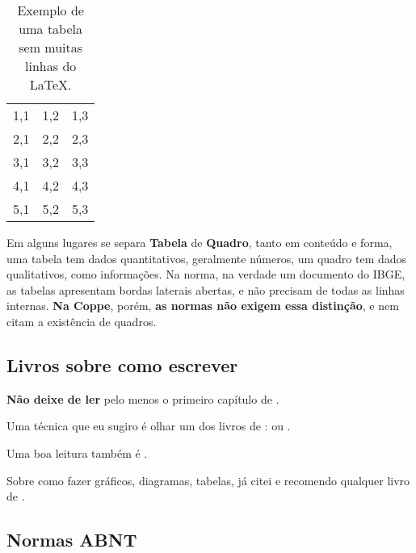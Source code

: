 \documentclass{article}
\begin{document}
\begin{outline}
\begin{table}[htb]
    \label{tab:tab3}
\end{table}

\begin{table}[htb]
    \centering
        \caption{Exemplo de uma tabela sem muitas linhas do \LaTeX .}
    \begin{tabular}{ccc}
    \hline
        1,1 & 1,2 & 1,3   \\
        2,1 & 2,2 & 2,3\\
        3,1 & 3,2 & 3,3\\
        4,1 & 4,2 & 4,3\\
        5,1 & 5,2 & 5,3\\
        \hline
    \end{tabular}\label{tab:tab4}
\end{table}

Em alguns lugares se separa \textbf{Tabela} de \textbf{Quadro}, tanto em conteúdo e forma, uma tabela tem dados quantitativos, geralmente números, um quadro tem dados qualitativos, como informações. Na norma, na verdade um documento do IBGE\citep{nat}, as tabelas apresentam bordas laterais abertas, e não precisam de todas as linhas internas. \textbf{Na Coppe}, porém, \textbf{as normas não exigem essa distinção}, e nem citam a existência de quadros. 

\subsection{Livros sobre como escrever}    

\textbf{Não deixe de ler} pelo menos o primeiro capítulo de \citep{mw}.

Uma técnica que eu sugiro é olhar um dos  livros de \citeauthor{minto1}:  \citep{minto1} ou \citep{minto2}. 

Uma boa leitura também é \citep{wcs}.

Sobre como fazer gráficos, diagramas, tabelas, já citei \citep{ei} e recomendo qualquer livro de \citeauthor{ei}.

\subsection{Normas ABNT}


\end{outline}
\end{document}

